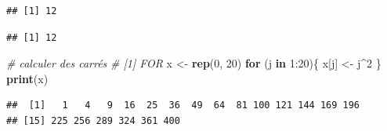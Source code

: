 \documentclass[twoside,symmetric]{book}
\newenvironment{Shaded}{}{}
\newcommand{\CommentTok}[1]{\textit{#1}}
\newcommand{\ControlFlowTok}[1]{\textbf{#1}}
\newcommand{\DataTypeTok}[1]{\underline{#1}}
\newcommand{\DecValTok}[1]{#1}
\newcommand{\KeywordTok}[1]{\textbf{#1}}
\newcommand{\NormalTok}[1]{#1}
\newcommand{\OperatorTok}[1]{#1}
\newcommand{\StringTok}[1]{#1}
\begin{document}
\begin{Shaded}
\end{Shaded}

\begin{verbatim}
## [1] 12
\end{verbatim}

\begin{Shaded}
\end{Shaded}

\begin{verbatim}
## [1] 12
\end{verbatim}

\begin{Shaded}
\begin{Highlighting}[]
\CommentTok{# calculer des carrés}
\CommentTok{# [1] FOR}
\NormalTok{x <-}\StringTok{ }\KeywordTok{rep}\NormalTok{(}\DecValTok{0}\NormalTok{, }\DecValTok{20}\NormalTok{)}
\ControlFlowTok{for}\NormalTok{ (j }\ControlFlowTok{in} \DecValTok{1}\OperatorTok{:}\DecValTok{20}\NormalTok{)\{}
\NormalTok{  x[j] <-}\StringTok{ }\NormalTok{j}\OperatorTok{^}\DecValTok{2}
\NormalTok{\}}
\KeywordTok{print}\NormalTok{(x)}
\end{Highlighting}
\end{Shaded}

\begin{verbatim}
##  [1]   1   4   9  16  25  36  49  64  81 100 121 144 169 196
## [15] 225 256 289 324 361 400
\end{verbatim}
\end{document}
